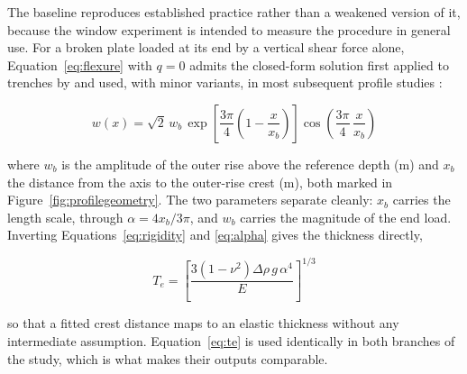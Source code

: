 \documentclass[final]{agujournal2019}
\begin{document}
The baseline reproduces established practice rather than a weakened version of
it, because the window experiment is intended to measure the procedure in
general use. For a broken plate loaded at its end by a vertical
shear force alone, Equation~\eqref{eq:flexure} with $q=0$ admits the closed-form
solution first applied to trenches by  and used, with minor
variants, in most subsequent profile studies
\cite{BodineWatts1979,Tandon2000,ContrerasReyesOsses2010}:
\begin{linenomath*}
\begin{equation}
  w(x) = \sqrt{2}\,w_{b}\,
  \exp\!\left[\frac{3\pi}{4}\left(1-\frac{x}{x_{b}}\right)\right]
  \cos\!\left(\frac{3\pi}{4}\,\frac{x}{x_{b}}\right)
  \label{eq:caldwell}
\end{equation}
\end{linenomath*}
where $w_{b}$ is the amplitude of the outer rise above the reference depth (m)
and $x_{b}$ the distance from the axis to the outer-rise crest (m), both marked
in Figure~\ref{fig:profilegeometry}. The two parameters separate cleanly:
$x_{b}$ carries the length scale, through $\alpha = 4x_{b}/3\pi$, and $w_{b}$
carries the magnitude of the end load. Inverting Equations~\eqref{eq:rigidity}
and \eqref{eq:alpha} gives the thickness directly,
\begin{linenomath*}
\begin{equation}
  T_{e} = \left[\frac{3\left(1-\nu^{2}\right)\Delta\rho\,g\,\alpha^{4}}{E}
  \right]^{1/3}
  \label{eq:te}
\end{equation}
\end{linenomath*}
so that a fitted crest distance maps to an elastic thickness without any
intermediate assumption. Equation~\eqref{eq:te} is used identically in both
branches of the study, which is what makes their outputs comparable.
\end{document}
